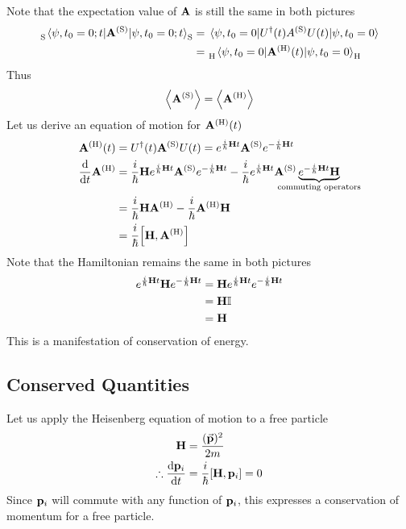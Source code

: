 \documentclass[12pt,a4paper,titlepage]{article}
\newcommand{\trm}[1]{\textrm{#1}} %
\begin{document}
Note that the expectation value of $\vb{A}$ is still the same in both pictures
\begin{equation}
\begin{aligned}
\tensor*[_{\trm{S}}]{\mel{\psi,t_{0}=0;t}{\vb{A}^{\trm{(S)}}}{\psi,t_{0}=0;t}}{_{\trm{S}}}&=\mel{\psi,t_{0}=0}{U^{\dagger}(t)A^{(\trm{S})}U(t)}{\psi,t_{0}=0}\\
&=\tensor*[_{\trm{H}}]{\mel{\psi,t_{0}=0}{\vb{A}^{\trm{(H)}}(t)}{\psi,t_{0}=0}}{_{\trm{H}}}
\end{aligned}
\end{equation}
Thus
\begin{equation}
\expval{\vb{A}^{\trm{(S)}}}=\expval{\vb{A}^{\trm{(H)}}}
\end{equation}
Let us derive an equation of motion for $\vb{A}^{\trm{(H)}}(t)$
\begin{equation}
\begin{aligned}
\vb{A}^{\trm{(H)}}(t)&=U^{\dagger}(t)\vb{A}^{(\trm{S})}U(t)=e^{\frac{i}{\hbar}\vb{H}t}\vb{A}^{\trm{(S)}}e^{-\frac{i}{\hbar}\vb{H}t}\\
\dv{t}\vb{A}^{\trm{(H)}}&=\frac{i}{\hbar}\vb{H}e^{\frac{i}{\hbar}\vb{H}t}\vb{A}^{\trm{(S)}}e^{-\frac{i}{\hbar}\vb{H}t}-\frac{i}{\hbar}e^{\frac{i}{\hbar}\vb{H}t}\vb{A}^{\trm{(S)}}\underbrace{e^{-\frac{i}{\hbar}\vb{H}t}\vb{H}}_{\mathclap{\trm{commuting operators}}}\\
&=\frac{i}{\hbar}\vb{H}\vb{A}^{\trm{(H)}}-\frac{i}{\hbar}\vb{A}^{\trm{(H)}}\vb{H}\\
&=\frac{i}{\hbar}\comm{\vb{H}}{\vb{A}^{\trm{(H)}}}
\end{aligned}
\end{equation}
Note that the Hamiltonian remains the same in both pictures
\begin{equation}
\begin{aligned}
e^{\frac{i}{\hbar}\vb{H}t}\vb{H}e^{-\frac{i}{\hbar}\vb{H}t}&=\vb{H}e^{\frac{i}{\hbar}\vb{H}t}e^{-\frac{i}{\hbar}\vb{H}t}\\
&=\vb{H}\mathbb{I}\\
&=\vb{H}
\end{aligned}
\end{equation}
This is a manifestation of conservation of energy.

\subsection{Conserved Quantities}
Let us apply the Heisenberg equation of motion to a free particle
\begin{equation}
\begin{aligned}
\vb{H}&=\frac{(\vec{\vb{p}})^{2}}{2m}\\
\therefore \dv{\vb{p}_{i}}{t}&=\frac{i}{\hbar}\comm{\vb{H}}{\vb{p}_{i}}=0
\end{aligned}
\end{equation}
Since $\vb{p}_{i}$ will commute with any function of $\vb{p}_{i}$, this expresses a conservation of momentum for a free particle.\\
\end{document}
